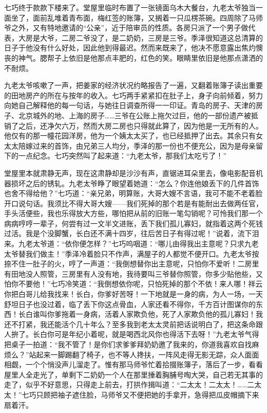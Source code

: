 \par 七巧终于款款下楼来了。堂屋里临时布置了一张镜面乌木大餐台，九老太爷独当一面坐了，面前乱堆着青布面，梅红签的账簿，又搁着一只瓜楞茶碗。四周除了马师爷之外，又有特地邀请的“公亲”，近于陪审员的性质。各房只派了一个男子做代表，大房是大爷，二房二爷没了，是二奶奶，三房是三爷。季泽很知道这总清算的日子于他没有什么好处，因此他到得最迟。然而来既来了，他决不愿意露出焦灼懊丧的神气。腮帮子上依旧是他那点丰肥的，红色的笑。眼睛里依旧是他那点潇洒的不耐烦。
\par 九老太爷咳嗽了一声，把姜家的经济状况约略报告了一遍，又翻着账簿子读出重要的田地房产的所在与按年的收入。七巧两手紧紧扣在肚子上，身子向前倾着，努力向她自己解释他的每一句话，与她往日调查所得一一印证。青岛的房子、天津的房子、北京城外的地、上海的房子……三爷在公账上拖欠过巨，他的一部份遗产被抵销了之后，还净欠六万，然而大房二房也只得就此算了，因为他是一无所有的人。他仅有的那一幢花园洋房，他为一个姨太太买了，也已经抵押了出去。其余只有女太太陪嫁过来的首饰，由兄弟三人均分，季泽的那一份也不便充公，因为是母亲留下的一点纪念。七巧突然叫了起来道：“九老太爷，那我们太吃亏了！”
\par 堂屋里本就肃静无声，现在这肃静却是沙沙有声，直锯进耳朵里去，像电影配音机器损坏之后的锈轧。九老太爷睁了眼望着她道：“怎么？你连他娘丢下的几件首饰也舍不得给他？”七巧道：“亲兄弟，明算账，大哥大嫂不言语，我可不能不老着脸开口说句话。我须比不得大哥大嫂——我们死掉的那个若是有能耐出去做两任官，手头活便些，我也乐得放大方些，哪怕把从前的旧账一笔勾销呢？可怜我们那一个病病哼哼一辈子，何尝有过一文半文进账，丢下我们孤儿寡妇，就指着这两个死钱过活。我是个没脚蟹，长白还不满十四岁，往后苦日子有得过呢！”说着，流下泪来。九老太爷道：“依你便怎样？”七巧呜咽道：“哪儿由得我出主意呢？只求九老太爷替我们做主！”季泽冷着脸只不作声，满屋子的人都觉不便开口。九老太爷按捺不住一肚子的火，哼了一声道：“我倒想替你出主意呢，只怕你不爱听！二房里有田地没人照管，三房里有人没有地，我待要叫三爷替你照管，你多少贴他些，又怕你不要他！”七巧冷笑道：“我倒想依你呢，只怕死掉的那个不依！来人哪！祥云你把白哥儿给我找来！长白，你爹好苦呀！一下地就是一身的病，为人一场，一天舒坦日子也没过着，临了丢下你这点骨血，人家还看不得你，千方百计图谋你的东西！长白谁叫你爹拖着一身病，活着人家欺负他，死了人家欺负他的孤儿寡妇！我还不打紧，我还能活个几十年么？至多我到老太太灵前把话说明白了，把这条命跟人拚了。长白你可是年纪小着呢，就是喝西北风你也得活下去呀！”九老太爷气得把桌子一拍道：“我不管了！是你们求爹爹拜奶奶邀了我来的，你道我喜欢自找麻烦么？”站起来一脚踢翻了椅子，也不等人搀扶，一阵风走得无影无踪，众人面面相觑，一个个悄没声儿溜走了。惟有那马师爷忙着拾掇账簿子，落后了一步，看看屋里人全走光了，单剩下二奶奶一个人在那里捶着胸脯号啕大哭，自己若无其事的走了，似乎不好意思，只得走上前去，打拱作揖叫道：“二太太！二太太！……二太太！”七巧只顾把袖子遮住脸，马师爷又不便把她的手拿开，急得把瓜皮帽摘下来扇着汗。
